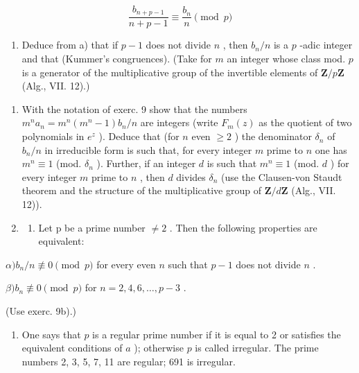 \[
\frac {b _ {n + p - 1}}{n + p - 1} \equiv \frac {b _ {n}}{n} \pmod {p}
\]

\begin{enumerate}
\def\labelenumi{\alph{enumi})}
\setcounter{enumi}{1}
\tightlist
\item
  Deduce from a) that if \(p - 1\) does not divide \(n\) , then \(b_{n} / n\) is a \(p\) -adic integer and that (Kummer's congruences). (Take for \(m\) an integer whose class mod. \(p\) is a generator of the multiplicative group of the invertible elements of \(\mathbf{Z} / p\mathbf{Z}\) (Alg., VII. 12).)
\end{enumerate}

\begin{enumerate}
\def\labelenumi{\arabic{enumi})}
\setcounter{enumi}{9}
\item
  With the notation of exerc. 9 show that the numbers \(m^n a_n = m^n (m^n - 1)b_n / n\) are integers (write \(F_m(z)\) as the quotient of two polynomials in \(e^z\) ). Deduce that (for \(n\) even \(\geqslant 2\) ) the denominator \(\delta_n\) of \(b_n / n\) in irreducible form is such that, for every integer \(m\) prime to \(n\) one has \(m^n \equiv 1\) (mod. \(\delta_n\) ). Further, if an integer \(d\) is such that \(m^n \equiv 1\) (mod. \(d\) ) for every integer \(m\) prime to \(n\) , then \(d\) divides \(\delta_n\) (use the Clausen-von Staudt theorem and the structure of the multiplicative group of \(\mathbf{Z} / d\mathbf{Z}\) (Alg., VII. 12)).
\item
  \begin{enumerate}
  \def\labelenumii{\alph{enumii})}
  \tightlist
  \item
    Let p be a prime number \(\neq 2\) . Then the following properties are equivalent:
  \end{enumerate}
\end{enumerate}

\(\alpha) b_n / n \not\equiv 0 \pmod{p}\) for every even \(n\) such that \(p - 1\) does not divide \(n\) .

\(\beta) b_n \not\equiv 0 \pmod{p}\) for \(n = 2, 4, 6, \ldots, p - 3\) .

(Use exerc. 9b).)

\begin{enumerate}
\def\labelenumi{\alph{enumi})}
\setcounter{enumi}{1}
\tightlist
\item
  One says that \(p\) is a regular prime number if it is equal to 2 or satisfies the equivalent conditions of \(a\) ); otherwise \(p\) is called irregular. The prime numbers 2, 3, 5, 7, 11 are regular; 691 is irregular.
\end{enumerate}

